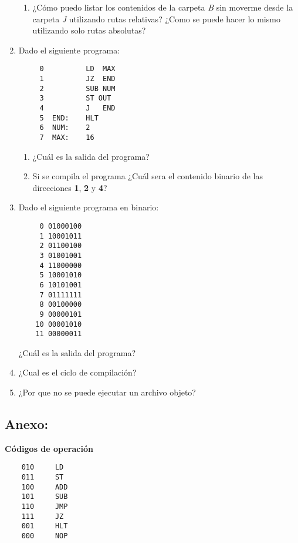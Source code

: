 \documentclass[12pt]{article}
\begin{document}
\begin{enumerate}
\begin{enumerate}
            \item ¿Cómo puedo listar los contenidos de la carpeta \emph{B}
                sin moverme desde la carpeta \emph{J} utilizando rutas
                relativas? ¿Como se puede hacer lo mismo utilizando solo rutas
                absolutas?

        \end{enumerate}

    \item Dado el siguiente programa:

        \begin{verbatim}
     0          LD  MAX
     1          JZ  END
     2          SUB NUM
     3          ST OUT
     4          J   END
     5  END:    HLT
     6  NUM:    2
     7  MAX:    16
        \end{verbatim}

        \begin{enumerate}

            \item ¿Cuál es la salida del programa?

            \item Si se compila el programa ¿Cuál sera el contenido binario de
                las direcciones \textbf{1}, \textbf{2} y \textbf{4}?

        \end{enumerate}

    \item Dado el siguiente programa en binario:

        \begin{verbatim}
     0 01000100
     1 10001011
     2 01100100
     3 01001001
     4 11000000
     5 10001010
     6 10101001
     7 01111111
     8 00100000
     9 00000101
    10 00001010
    11 00000011
        \end{verbatim}

        ¿Cuál es la salida del programa?

    \item ¿Cual es el ciclo de compilación?

    \item ¿Por que no se puede ejecutar un archivo objeto?

\end{enumerate}

\subsection*{ \large\textbf{Anexo:} }

\textbf{Códigos de operación}

\begin{verbatim}
    010     LD
    011     ST
    100     ADD
    101     SUB
    110     JMP
    111     JZ
    001     HLT
    000     NOP
\end{verbatim}
\end{document}
